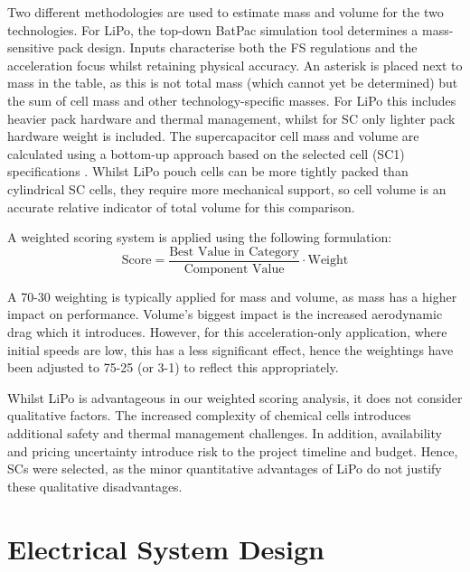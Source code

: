 \documentclass[11pt, a4paper]{report}
\numberwithin{equation}{section}
\begin{document}
\begin{refsection}
Two different methodologies are used to estimate mass and volume for the two technologies. For LiPo, the top-down BatPac simulation tool \cite{batpac2022manual} determines a mass-sensitive pack design. Inputs characterise both the FS regulations and the acceleration focus whilst retaining physical accuracy. An asterisk is placed next to mass in the table, as this is not total mass (which cannot yet be determined) but the sum of cell mass and other technology-specific masses. For LiPo this includes heavier pack hardware and thermal management, whilst for SC only lighter pack hardware weight is included. The supercapacitor cell mass and volume are calculated using a bottom-up approach based on the selected cell (SC1) specifications \cite{sech-c46w-3r0-0600}. Whilst LiPo pouch cells can be more tightly packed than cylindrical SC cells, they require more mechanical support, so cell volume is an accurate relative indicator of total volume for this comparison.

A weighted scoring system is applied using the following formulation:
\begingroup
\setlength{\abovedisplayskip}{8pt plus 0pt minus 0pt}
\setlength{\belowdisplayskip}{8pt plus 0pt minus 0pt}
\setlength{\abovedisplayshortskip}{8pt plus 0pt minus 0pt}
\setlength{\belowdisplayshortskip}{8pt plus 0pt minus 0pt}
\begin{equation*}
\text{Score} = \frac{\text{Best Value in Category}}{\text{Component Value}} \cdot \text{Weight}
\end{equation*}
\endgroup

A 70-30 weighting is typically applied for mass and volume, as mass has a higher impact on performance. Volume's biggest impact is the increased aerodynamic drag which it introduces. However, for this acceleration-only application, where initial speeds are low, this has a less significant effect, hence the weightings have been adjusted to 75-25 (or 3-1) to reflect this appropriately.

Whilst LiPo is advantageous in our weighted scoring analysis, it does not consider qualitative factors. The increased complexity of chemical cells introduces additional safety and thermal management challenges. In addition, availability and pricing uncertainty introduce risk to the project timeline and budget. Hence, SCs were selected, as the minor quantitative advantages of LiPo do not justify these qualitative disadvantages.

\section{Electrical System Design}
\label{sec:electrical_system_design}


\end{refsection}
\end{document}
